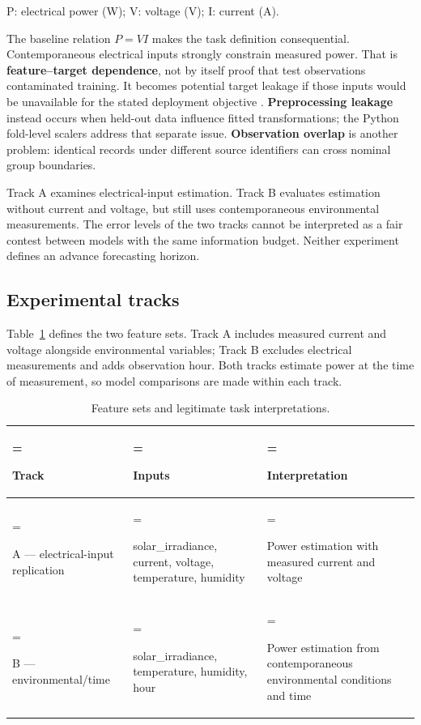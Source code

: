 \documentclass[10pt,journal,twoside]{IEEEtran}
\begin{document}
{\footnotesize P: electrical power (W); V: voltage (V); I: current (A).\par}


The baseline relation $P=VI$ makes the task definition consequential. Contemporaneous electrical
inputs strongly constrain measured power. That is \textbf{feature--target dependence}, not by itself
proof that test observations contaminated training. It becomes potential target leakage if
those inputs would be unavailable for the stated deployment objective \cite{ref4}.
\textbf{Preprocessing leakage} instead occurs when held-out data influence fitted transformations;
the Python fold-level scalers address that separate issue. \textbf{Observation overlap} is another
problem: identical records under different source identifiers can cross nominal group boundaries.

Track A examines electrical-input estimation. Track B evaluates estimation without current and
voltage, but still uses contemporaneous environmental measurements. The error levels of the two
tracks cannot be interpreted as a fair contest between models with the same information budget.
Neither experiment defines an advance forecasting horizon.


\subsection{Experimental tracks}

Table~\ref{tab:2} defines the two feature sets. Track A includes measured current and voltage alongside environmental variables; Track B excludes electrical measurements and adds observation hour. Both tracks estimate power at the time of measurement, so model comparisons are made within each track.

\begin{table}[!t]
\caption{Feature sets and legitimate task interpretations.}
\label{tab:2}
\centering\footnotesize
\setlength{\tabcolsep}{4pt}
\renewcommand{\arraystretch}{1.18}
\begin{tabularx}{\textwidth}{>{\hsize=0.643\hsize\linewidth=\hsize\raggedright\arraybackslash}X >{\hsize=1.071\hsize\linewidth=\hsize\raggedright\arraybackslash}X >{\hsize=1.286\hsize\linewidth=\hsize\raggedright\arraybackslash}X}
\toprule
\textbf{Track} & \textbf{Inputs} & \textbf{Interpretation} \\ \midrule
A --- electrical-input replication & solar\_irradiance, current, voltage, temperature, humidity & Power estimation with measured current and voltage \\
B --- environmental/time & solar\_irradiance, temperature, humidity, hour & Power estimation from contemporaneous environmental conditions and time \\
\bottomrule\end{tabularx}
\par{}
\end{table}
\end{document}
